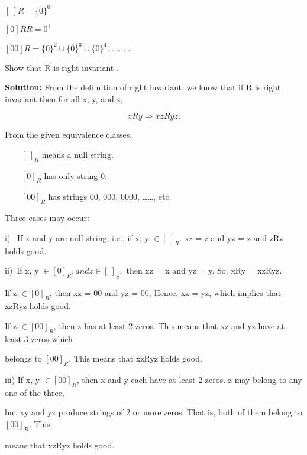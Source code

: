 \documentclass[10pt,a4paper]{article}
\begin{document}
$[ \:] R = \{0\}^{0}$

$[ 0 ]RR = {0}^{1}$

$[00]R = \{0\}^{2} \cup \{0\}^{3} \cup \{0\}^{4} ……….$

Show that R is right invariant .

\begin{flushleft}
  \qquad\textbf{\textsf{Solution:}} From the defi nition of right invariant, we know that if R is right invariant then for
all x, y, and z,
\end{flushleft}

$$ xRy \Rightarrow xzRyz. $$

From the given equivalence classes,

$\qquad [\: ]_{R} $ means a null string.

$\qquad[0]_{R} $ has only string 0.

$\qquad[00]_{R} $ has strings 00, 000, 0000, ……, etc.

\quad \tiny
\quad

Three cases may occur:

i) \, If x and y are null string, i.e., if x, y $\in [\: ]_{R}$. xz = z and yz = z and zRz holds good.

ii) \,If x, y $\in [0]_{R}, and z \in [ \:]_{_{R}},$ then xz = x and yz = y. So, xRy = xzRyz.

\qquad If z $\in [0]_{R}$, then xz = 00 and yz = 00, Hence, xz = yz, which implies that xzRyz holds good.

\qquad If z $\in [00]_{R}$, then z has at least 2 zeros. This means that xz and yz have at least 3 zeros which

belongs to $[00]_{R}$. This means that xzRyz holds good.

iii) If x, y $\in [00]_{R}$, then x and y each have at least 2 zeros. z may belong to any one of the three,

\qquad but xy and yz produce strings of 2 or more zeros. That is, both of them belong to $[00]_{R}$. This

\qquad means that xzRyz holds good.
\end{document}
